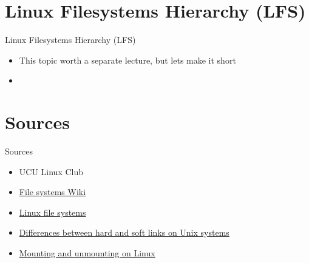 \documentclass[usenames,dvipsnames,10pt,aspectratio=169]{beamer}
\begin{document}
\section{Linux Filesystems Hierarchy (LFS)}

\begin{frame}{Linux Filesystems Hierarchy (LFS)}
    \begin{itemize}
        \item This topic worth a separate lecture, but lets make it short 
        \item 
    \end{itemize}
\end{frame}


\section{Sources}
\begin{frame}{Sources}
    \begin{itemize}
        \item UCU Linux Club
        \item \href{https://en.wikipedia.org/wiki/File_system}{File systems Wiki}
        \item \href{https://www.javatpoint.com/linux-files}{Linux file systems}
        \item \href{http://www.differencebetween.net/technology/difference-between-soft-link-and-hard-link-in-unix-in-os/}{Differences between hard and soft links on Unix systems}
        \item \href{https://techviewleo.com/mounting-and-unmounting-filesystems-on-linux/}{Mounting and unmounting on Linux}
    \end{itemize}
\end{frame}
\end{document}
